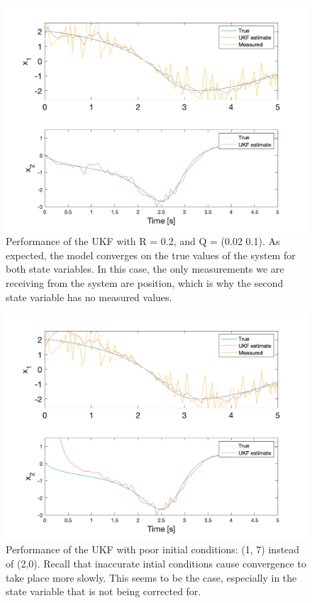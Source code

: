 \begin{figure}[h]
    \centering
    \includegraphics[scale = 0.6]{VDP.png}
    \caption{Performance of the UKF with R = 0.2, and Q = (0.02 0.1).
    As expected, the model converges on the true values of the system for both state variables. In this case, the only measurements we are receiving from the system are position, which is why the second state variable has no measured values.}
\end{figure}
\begin{figure}[h]
    \centering
    \includegraphics[scale = 0.6]{VDP_badinitial.png}
    \caption{Performance of the UKF with poor initial conditions: (1, 7)  instead of (2,0). Recall that inaccurate intial conditions cause convergence to take place more slowly. This seems to be the case, especially in the state variable that is not being corrected for.}
\end{figure}



